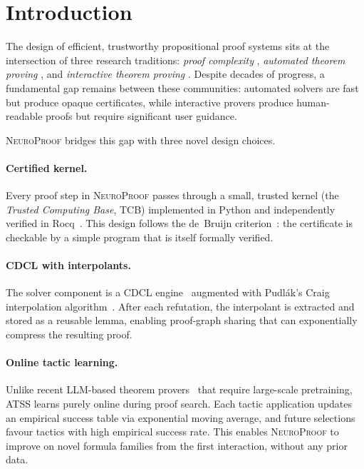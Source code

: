 \documentclass[conference]{IEEEtran}
\newcommand{\NP}{\textsc{NeuroProof}}
\newcommand{\ATSS}{\textsc{ATSS}}
\begin{document}
\section{Introduction}
\label{sec:intro}

The design of efficient, trustworthy propositional proof systems sits at the
intersection of three research traditions: \emph{proof complexity}
\cite{CookReckhow1979,Ben-Sasson2001}, \emph{automated theorem proving}
\cite{Davis1962,Robinson1965}, and \emph{interactive theorem proving}
\cite{CoqDevelopmentTeam2024,MouraKong2021}.  Despite decades of progress, a
fundamental gap remains between these communities: automated solvers are fast
but produce opaque certificates, while interactive provers produce
human-readable proofs but require significant user guidance.

\NP{} bridges this gap with three novel design choices.

\paragraph{Certified kernel.}
Every proof step in \NP{} passes through a small, trusted kernel
(the \emph{Trusted Computing Base}, TCB) implemented in Python and
independently verified in Rocq~\cite{CoqDevelopmentTeam2024}.  This design
follows the de~Bruijn criterion~\cite{Harrison2009}: the certificate is
checkable by a simple program that is itself formally verified.

\paragraph{CDCL with interpolants.}
The solver component is a CDCL engine~\cite{Marques-Silva1999,EenSorensson2003}
augmented with Pudlák's Craig interpolation algorithm~\cite{Krajicek1995}.
After each refutation, the interpolant is extracted and stored as a reusable
lemma, enabling proof-graph sharing that can exponentially compress the
resulting proof.

\paragraph{Online tactic learning.}
Unlike recent LLM-based theorem provers~\cite{YangPoezia2024,SongYangAnandkumar2024,
DeepSeekProver2024} that require large-scale pretraining, \ATSS{} learns purely
online during proof search.  Each tactic application updates an empirical
success table via exponential moving average, and future selections favour
tactics with high empirical success rate.  This enables \NP{} to improve on
novel formula families from the first interaction, without any prior data.
\end{document}
